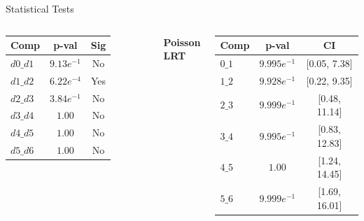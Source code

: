 \documentclass[aspectratio=169]{beamer}
\begin{document}
\begin{frame}{Statistical Tests}
\begin{columns}[T]
\begin{tabular}{lcc}
\toprule
Comp & p-val & Sig \\
\midrule
$d0\_d1$ & $9.13e^{-1}$ & No \\
$d1\_d2$ & $6.22e^{-4}$ & Yes \\
$d2\_d3$ & $3.84e^{-1}$ & No \\
$d3\_d4$ & $1.00$ & No \\
$d4\_d5$ & $1.00$ & No \\
$d5\_d6$ & $1.00$ & No \\
\bottomrule
\end{tabular}

\vspace{0.5cm}

\textbf{Poisson LRT}
\vspace{0.1cm}

\begin{tabular}{lcc}
\toprule
Comp & p-val & CI \\
\midrule
$0\_1$ & $9.995e^{-1}$ & [0.05, 7.38] \\
$1\_2$ & $9.928e^{-1}$ & [0.22, 9.35] \\
$2\_3$ & $9.999e^{-1}$ & [0.48, 11.14] \\
$3\_4$ & $9.995e^{-1}$ & [0.83, 12.83] \\
$4\_5$ & $1.00$ & [1.24, 14.45] \\
$5\_6$ & $9.999e^{-1}$ & [1.69, 16.01] \\
\bottomrule
\end{tabular}

\end{columns}

\end{frame}
\end{document}
